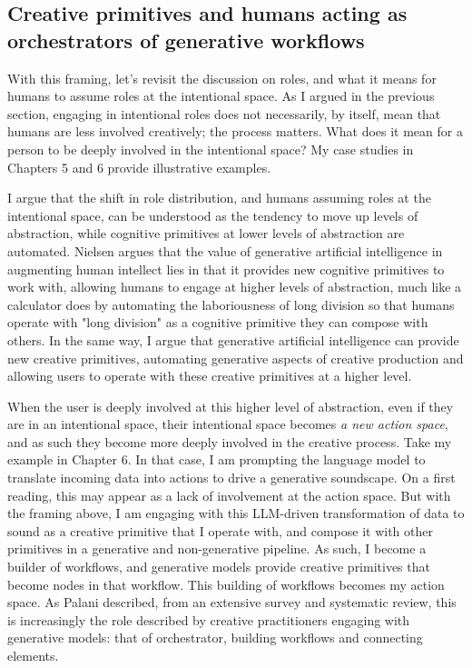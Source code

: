 \subsection{Creative primitives and humans acting as orchestrators of generative workflows}

With this framing, let's revisit the discussion on roles, and what it means for humans to assume roles at the intentional space. As I argued in the previous section, engaging in intentional roles does not necessarily, by itself, mean that humans are less involved creatively; the process matters. What does it mean for a person to be deeply involved in the intentional space? My case studies in Chapters 5 and 6 provide illustrative examples.

I argue that the shift in role distribution, and humans assuming roles at the intentional space, can be understood as the tendency to move up levels of abstraction, while cognitive primitives at lower levels of abstraction are automated. Nielsen argues that the value of generative artificial intelligence in augmenting human intellect lies in that it provides new cognitive primitives to work with, allowing humans to engage at higher levels of abstraction, much like a calculator does by automating the laboriousness of long division so that humans operate with "long division" as a cognitive primitive they can compose with others. In the same way, I argue that generative artificial intelligence can provide new creative primitives, automating generative aspects of creative production and allowing users to operate with these creative primitives at a higher level.

When the user is deeply involved at this higher level of abstraction, even if they are in an intentional space, their intentional space becomes \textit{a new action space}, and as such they become more deeply involved in the creative process. Take my example in Chapter 6. In that case, I am prompting the language model to translate incoming data into actions to drive a generative soundscape. On a first reading, this may appear as a lack of involvement at the action space. But with the framing above, I am engaging with this LLM-driven transformation of data to sound as a creative primitive that I operate with, and compose it with other primitives in a generative and non-generative pipeline. As such, I become a builder of workflows, and generative models provide creative primitives that become nodes in that workflow. This building of workflows becomes my action space. As Palani described, from an extensive survey and systematic review, this is increasingly the role described by creative practitioners engaging with generative models: that of orchestrator, building workflows and connecting elements.


